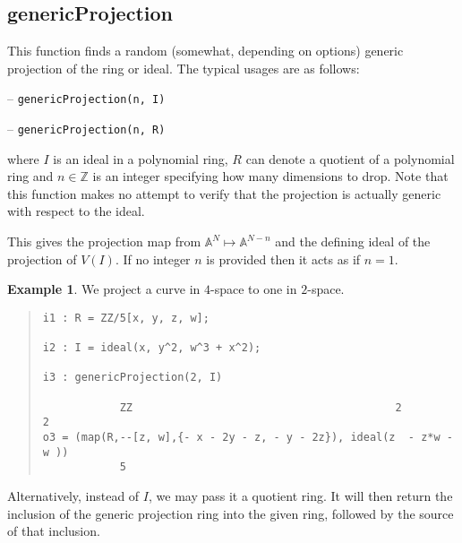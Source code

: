 \documentclass[11pt]{amsart}
\theoremstyle{definition}
\newtheorem{example}{Example}[section]
\begin{document}
\subsection{genericProjection} 
This function finds a random (somewhat, depending on options) generic projection of the ring or ideal.
The typical usages are as follows: 
\vspace{0.5em}

-- {\tt genericProjection(n, I)}

-- {\tt genericProjection(n, R)}

\vspace{0.5em}
\noindent where 
$I$ is an ideal 
in a polynomial ring, 
$R$ can denote a quotient of a polynomial ring and 
$n\in \mathbb{Z}$ is
an integer specifying how many dimensions to drop.  Note that this function makes no attempt to verify that the projection is actually generic with respect to the ideal.


This gives the projection map from $\mathbb{A}^N \mapsto\mathbb{A}^{N-n}$ and the defining ideal of the projection of $V(I)$. If no integer $n$ is provided then it acts as if $n = 1$. 


\begin{example}	
    We project a curve in $4$-space to one in $2$-space.
    ~~
  {{\small\color{blue}
  \begin{quote}
\begin{verbatim}
i1 : R = ZZ/5[x, y, z, w];

i2 : I = ideal(x, y^2, w^3 + x^2);

i3 : genericProjection(2, I)

            ZZ                                         2          2
o3 = (map(R,--[z, w],{- x - 2y - z, - y - 2z}), ideal(z  - z*w - w ))                   
            5
\end{verbatim}
\end{quote}
    }}
\end{example}\vspace{-1em}
\noindent
Alternatively, instead of {$I$}, we may pass it a quotient ring.  It will then return the inclusion of the generic projection ring into the given ring, followed by the source of that inclusion.  %
\end{document}

